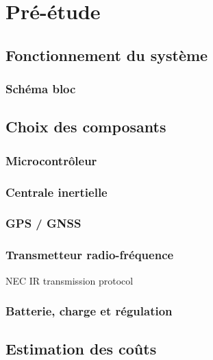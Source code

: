 \section{Pré-étude} \label{sec:Pre-Etude}

\subsection{Fonctionnement du système} \label{ssec:Fonctionnement}

\subsubsection{Schéma bloc} \label{sssec:Schema-bloc}

\subsection{Choix des composants} \label{ssec:Choix-composant}

\subsubsection{Microcontrôleur} \label{sssec:Choix-MCU}

\subsubsection{Centrale inertielle} \label{sssec:Choix-Centrale-inertielle}

\subsubsection{GPS / GNSS} \label{sssec:Choix-GPS}

\subsubsection{Transmetteur radio-fréquence} \label{sssec:Choix-Rft}
NEC IR transmission protocol

\subsubsection{Batterie, charge et régulation} \label{sssec:Choix-Batterie-charge}

\subsection{Estimation des coûts} \label{sssec:Estimation-Couts}
